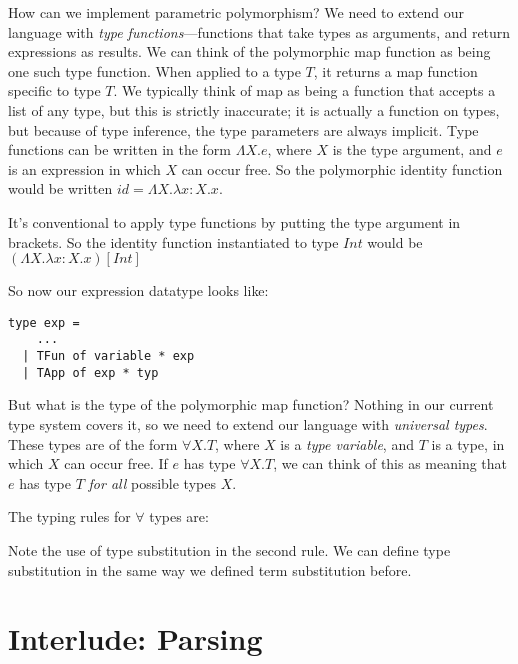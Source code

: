 \documentclass[pageno]{jpaper}
\begin{document}
{How can we implement parametric polymorphism? We need to extend our language with \textit{type functions}---functions that take types as arguments, and return expressions as results. 
We can think of the polymorphic map function as being one such type function. When applied to a type $T$, it
returns a map function specific to type $T$.
We typically think of map as being a function that accepts a list of any type, but this is strictly
inaccurate; it is actually a function on types, but because of type inference, the type parameters are
always implicit. Type functions can be written in the form $\Lambda X.e$, where $X$ is the type argument,
and $e$ is an expression in which $X$ can occur free. So the polymorphic identity function would be
written $id = \Lambda X.\lambda x:X.x$.

It's conventional to apply type functions by putting the type argument in brackets.  So the identity function
instantiated to type $Int$ would be $(\Lambda X.\lambda x:X.x) [Int]$

So now our expression datatype looks like:

\begin{lstlisting}
type exp =
    ...
  | TFun of variable * exp
  | TApp of exp * typ
\end{lstlisting}

But what is the type of the polymorphic map function? Nothing in our current type system covers it, so we need to
extend our language with \textit{universal types}. These types are of the form $\forall X. T$, where
$X$ is a \textit{type variable}, and $T$ is a type, in which $X$ can occur free.  If $e$
has type $\forall X.T$, we can think of this as meaning that $e$ has type $T$ \textit{for all} possible
types $X$.

The typing rules for $\forall$ types are:

\begin{prooftree}
\end{prooftree}

\begin{prooftree}
\end{prooftree}

Note the use of type substitution in the second rule. We can define type substitution in
the same way we defined term substitution before.

\section{Interlude: Parsing}

}
\end{document}
